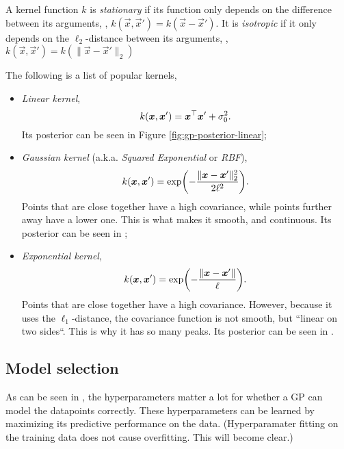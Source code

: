 \begin{definition}
  A kernel function $k$ is \textit{stationary} if its function only depends on
  the difference between its arguments, \ie,
  $k(\vec{x},\vec{x}')=k(\vec{x}-\vec{x}')$. It is \textit{isotropic} if it only
  depends on the $\ell_2$-distance between its arguments, \ie,
  $k(\vec{x},\vec{x}')=k(\lVert \vec{x}-\vec{x}' \rVert_2)$
\end{definition}

The following is a list of popular kernels,
\begin{itemize}
  \item \textit{Linear kernel}, \[
      k(\bm{x},\bm{x}') = \bm{x}^\top\bm{x}' + \sigma_0^2
    .\]
    Its posterior can be seen in Figure \ref{fig:gp-posterior-linear};

  \item \textit{Gaussian kernel} (a.k.a. \textit{Squared Exponential} or
    \textit{RBF}), \[
      k(\vec{x},\vec{x}') = \exp \lft( -\frac{\lVert \vec{x}-\vec{x}'
      \rVert^2_2}{2\ell^2} \rgt)
    .\]
    Points that are close together have a high covariance, while points further
    away have a lower one. This is what makes it smooth, and continuous. Its
    posterior can be seen in ;

  \item \textit{Exponential kernel}, \[
      k(\vec{x},\vec{x}') = \exp \lft( -\frac{\lVert \vec{x}-\vec{x}' \rVert}{\ell} \rgt)
    .\]
    Points that are close together have a high covariance. However, because it
    uses the $\ell_1$-distance, the covariance function is not smooth, but
    ``linear on two sides``.  This is why it has so many peaks. Its posterior
    can be seen in .
\end{itemize}

\subsection{Model selection}


As can be seen in
,
the hyperparameters matter a lot for whether a GP can model the datapoints
correctly. These hyperparameters can be learned by maximizing its predictive
performance on the data. (Hyperparamater fitting on the training data does not
cause overfitting. This will become clear.)

